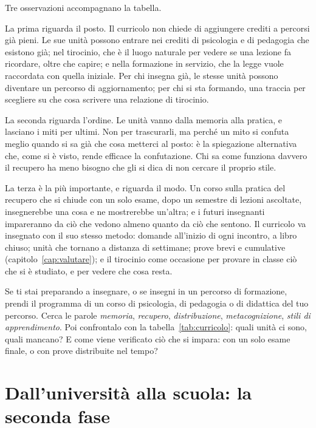 Tre osservazioni accompagnano la tabella.

La prima riguarda il posto. Il curricolo non chiede di aggiungere
crediti a percorsi già pieni. Le sue unità possono entrare nei crediti
di psicologia e di pedagogia che esistono già; nel tirocinio, che è il
luogo naturale per vedere se una lezione fa ricordare, oltre che
capire; e nella formazione in servizio, che la legge vuole raccordata
con quella iniziale. Per chi insegna già, le stesse unità possono
diventare un percorso di aggiornamento; per chi si sta formando, una
traccia per scegliere su che cosa scrivere una relazione di tirocinio.

La seconda riguarda l'ordine. Le unità vanno dalla memoria alla
pratica, e lasciano i miti per ultimi. Non per trascurarli, ma perché
un mito si confuta meglio quando si sa già che cosa metterci al posto:
è la spiegazione alternativa che, come si è visto, rende efficace la
confutazione. Chi sa come funziona davvero il recupero ha meno bisogno
che gli si dica di non cercare il proprio stile.

La terza è la più importante, e riguarda il modo. Un corso sulla
pratica del recupero che si chiude con un solo esame, dopo un semestre
di lezioni ascoltate, insegnerebbe una cosa e ne mostrerebbe un'altra;
e i futuri insegnanti impareranno da ciò che vedono almeno quanto da
ciò che sentono. Il curricolo va insegnato con il suo stesso metodo:
domande all'inizio di ogni incontro, a libro chiuso; unità che
tornano a distanza di settimane; prove brevi e cumulative
(capitolo~\ref{cap:valutare}); e il tirocinio come occasione per
provare in classe ciò che si è studiato, e per vedere che cosa resta.

\begin{esercizio}
Se ti stai preparando a insegnare, o se insegni in un percorso di
formazione, prendi il programma di un corso di psicologia, di
pedagogia o di didattica del tuo percorso. Cerca le parole
\emph{memoria}, \emph{recupero}, \emph{distribuzione},
\emph{metacognizione}, \emph{stili di apprendimento}. Poi confrontalo
con la tabella~\ref{tab:curricolo}: quali unità ci sono, quali
mancano? E come viene verificato ciò che si impara: con un solo esame
finale, o con prove distribuite nel tempo?
\end{esercizio}

\section{Dall'università alla scuola: la seconda fase}

